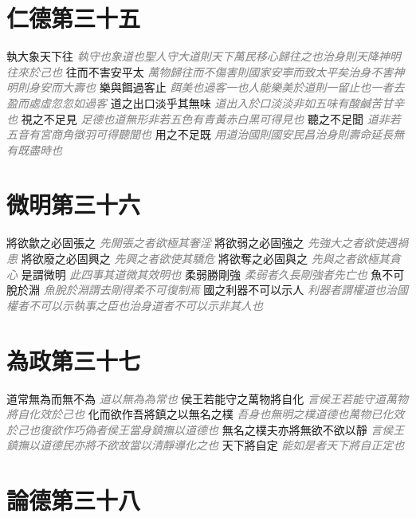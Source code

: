 \documentclass[a4paper,zihao=-4,oneside,landscape,UTF8]{ctexart}
\newcommand{\zhushi}[1]{\scriptsize{\textit{\textcolor{gray}{#1}}}\normalsize}
\begin{document}
\section{仁德第三十五}

執大象天下往
\zhushi{執守也象道也聖人守大道則天下萬民移心歸往之也治身則天降神明往來於己也}
往而不害安平太
\zhushi{萬物歸往而不傷害則國家安寕而致太平矣治身不害神明則身安而大壽也}
樂與餌過客止
\zhushi{餌美也過客一也人能樂美於道則一留止也一者去盈而處虛忽忽如過客}
道之出口淡乎其無味
\zhushi{道出入於口淡淡非如五味有酸鹹苦甘辛也}
視之不足見
\zhushi{足德也道無形非若五色有青黃赤白黑可得見也}
聽之不足聞
\zhushi{道非若五音有宮商角徵羽可得聽聞也}
用之不足既
\zhushi{用道治國則國安民昌治身則壽命延長無有既盡時也}


\section{微明第三十六}

將欲歙之必固張之
\zhushi{先開張之者欲極其奢淫}
將欲弱之必固強之
\zhushi{先強大之者欲使遇禍患}
將欲廢之必固興之
\zhushi{先興之者欲使其驕危}
將欲奪之必固與之
\zhushi{先與之者欲極其貪心}
是謂微明
\zhushi{此四事其道微其效明也}
柔弱勝剛強
\zhushi{柔弱者久長剛強者先亡也}
魚不可脫於淵
\zhushi{魚脫於淵謂去剛得柔不可復制焉}
國之利器不可以示人
\zhushi{利器者謂權道也治國權者不可以示執事之臣也治身道者不可以示非其人也}


\section{為政第三十七}

道常無為而無不為
\zhushi{道以無為為常也}
侯王若能守之萬物將自化
\zhushi{言侯王若能守道萬物將自化效於己也}
化而欲作吾將鎮之以無名之樸
\zhushi{吾身也無明之樸道德也萬物已化效於己也復欲作巧偽者侯王當身鎮撫以道德也}
無名之樸夫亦將無欲不欲以靜
\zhushi{言侯王鎮撫以道德民亦將不欲故當以清靜導化之也}
天下將自定
\zhushi{能如是者天下將自正定也}


\section{論德第三十八}
\end{document}
